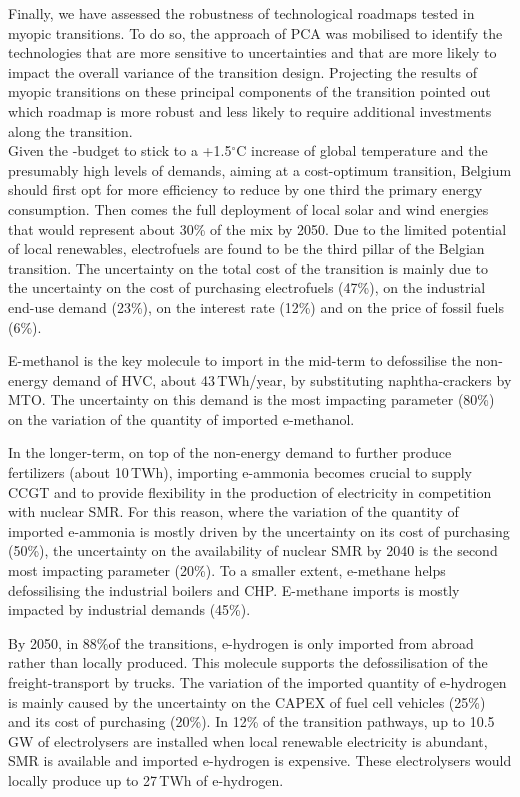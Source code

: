Finally, we have assessed the robustness of technological roadmaps tested in myopic transitions. To do so, the approach of \acrfull{PCA} was mobilised to identify the technologies that are more sensitive to uncertainties and that are more likely to impact the overall variance of the transition design. Projecting the results of myopic transitions on these principal components of the transition pointed out which roadmap is more robust and less likely to require additional investments along the transition.\\

Given the -budget to stick to a +1.5$^{\circ}$C increase of global temperature and the presumably high levels of demands,  aiming at a cost-optimum transition, Belgium should first opt for more efficiency to reduce by one third the primary energy consumption. Then comes the full deployment of local solar and wind energies that would represent about 30\% of the mix by 2050. Due to the limited potential of local renewables, electrofuels are found to be the third pillar of the Belgian transition. The uncertainty on the total cost of the transition is mainly due to the uncertainty on the cost of purchasing electrofuels (47\%), on the industrial end-use demand (23\%), on the interest rate (12\%) and on the price of fossil fuels (6\%).

E-methanol is the key molecule to import in the mid-term to defossilise the non-energy demand of \acrfull{HVC}, about 43\,TWh/year, by substituting naphtha-crackers by \acrfull{MTO}. The uncertainty on this demand is the most impacting parameter (80\%) on the variation of the quantity of imported e-methanol. 

In the longer-term, on top of the non-energy demand to further produce fertilizers (about 10\,TWh), importing e-ammonia becomes crucial to supply \acrfull{CCGT} and to provide flexibility in the production of electricity in competition with nuclear \acrfull{SMR}. For this reason, where the variation of the quantity of imported e-ammonia is mostly driven by the uncertainty on its cost of purchasing (50\%), the uncertainty on the availability of nuclear \gls{SMR} by 2040 is the second most impacting parameter (20\%). To a smaller extent, e-methane helps defossilising the industrial boilers and \acrfull{CHP}. E-methane imports is mostly impacted by industrial demands (45\%). 

By 2050, in 88\%of the transitions, e-hydrogen is only imported from abroad rather than locally produced. This molecule supports the defossilisation of the freight-transport by trucks. The variation of the imported quantity of e-hydrogen is mainly caused by the uncertainty on the CAPEX of fuel cell vehicles (25\%) and its cost of purchasing (20\%). In 12\% of the transition pathways, up to 10.5\,GW of electrolysers are installed when local renewable electricity is abundant, \gls{SMR} is available and imported e-hydrogen is expensive. These electrolysers would locally produce up to 27\,TWh of e-hydrogen. 

